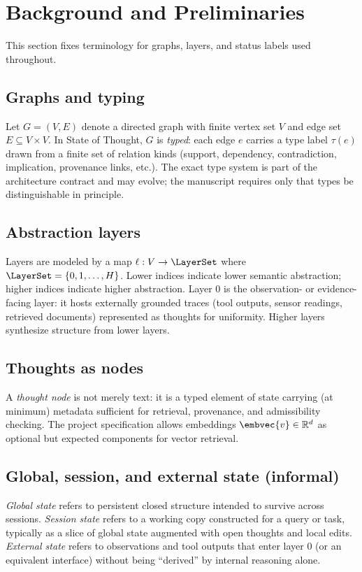 \section{Background and Preliminaries}
\label{sec:background}

This section fixes terminology for graphs, layers, and status labels used throughout.

\subsection{Graphs and typing}
Let $G=(V,E)$ denote a directed graph with finite vertex set $V$ and edge set $E\subseteq V\times V$.
In State of Thought, $G$ is \emph{typed}: each edge $e$ carries a type label $\tau(e)$ drawn from a finite set of relation kinds (support, dependency, contradiction, implication, provenance links, etc.).
The exact type system is part of the architecture contract and may evolve; the manuscript requires only that types be distinguishable in principle.

\subsection{Abstraction layers}
Layers are modeled by a map $\ell:V\to\LayerSet$ where $\LayerSet=\{0,1,\ldots,H\}$.
Lower indices indicate lower semantic abstraction; higher indices indicate higher abstraction.
Layer $0$ is the observation- or evidence-facing layer: it hosts externally grounded traces (tool outputs, sensor readings, retrieved documents) represented as thoughts for uniformity.
Higher layers synthesize structure from lower layers.

\subsection{Thoughts as nodes}
A \emph{thought node} is not merely text: it is a typed element of state carrying (at minimum) metadata sufficient for retrieval, provenance, and admissibility checking.
The project specification allows embeddings $\embvec{v}\in\mathbb{R}^d$ as optional but expected components for vector retrieval.

\subsection{Global, session, and external state (informal)}
\emph{Global state} refers to persistent closed structure intended to survive across sessions.
\emph{Session state} refers to a working copy constructed for a query or task, typically as a slice of global state augmented with open thoughts and local edits.
\emph{External state} refers to observations and tool outputs that enter layer $0$ (or an equivalent interface) without being ``derived'' by internal reasoning alone.

